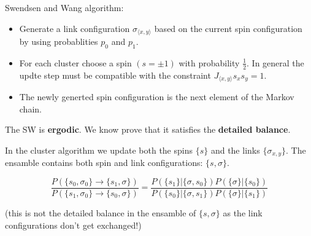 \documentclass[12pt,handout]{beamer}
\begin{document}
\begin{frame}
\begin{center}
{\Large Swendsen and Wang algorithm:}

\begin{itemize}
\item Generate a link configuration $\sigma_{\langle x, y \rangle}$ based on the current spin configuration by using probablities $p_0$ and $p_1$. 
\item For each cluster choose a spin $\left( s = \pm 1 \right)$ with probability $\frac{1}{2}$. In general the updte step must be compatible with the constraint $J_{\langle x, y \rangle}  s_x s_y = 1$.
\item The newly generted spin configuration is the next element of the Markov chain.
\end{itemize}

\vspace{20pt}
The SW is \textbf{ergodic}. We know prove that it satisfies the \textbf{detailed balance}.

\end{center}
\end{frame}

\begin{frame}
\begin{center}
In the cluster algorithm we update both the spins $\lbrace s \rbrace$ and the links $\lbrace \sigma_{x, y} \rbrace$. The ensamble contains both spin and link configurations: $\lbrace s,  \sigma \rbrace$.

\[
\frac{P \left( \lbrace s_0, \sigma_0 \rbrace \rightarrow \lbrace s_1, \sigma \rbrace \right)}{ P \left( \lbrace s_1, \sigma_0 \rbrace \rightarrow \lbrace s_0, \sigma \rbrace \right)} = \frac{P \left( \lbrace s_1 \rbrace | \lbrace \sigma, s_0 \rbrace \right) P \left( \lbrace \sigma \rbrace | \lbrace s_0 \rbrace \right) }{ P \left( \lbrace s_0 \rbrace | \lbrace \sigma, s_1 \rbrace \right) P \left( \lbrace \sigma \rbrace | \lbrace s_1 \rbrace \right) }
\]

(this is not the detailed balance in the ensamble of $\lbrace s,  \sigma \rbrace$ as the link configurations don't get exchanged!)


\end{center}
\end{frame}
\end{document}
